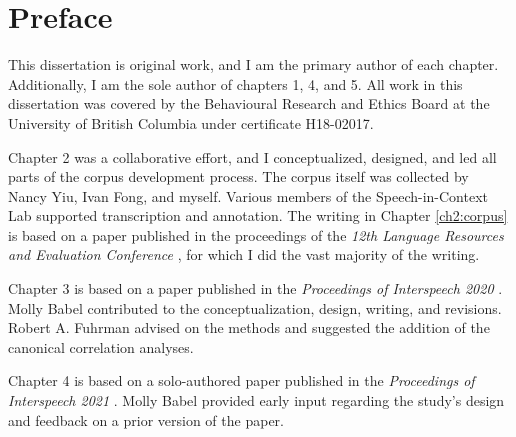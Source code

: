 
\chapter{Preface}

This dissertation is original work, and I am the primary author of each chapter. Additionally, I am the sole author of chapters 1, 4, and 5. All work in this dissertation was covered by the Behavioural Research and Ethics Board at the University of British Columbia under certificate H18-02017. 

Chapter 2 was a collaborative effort, and I conceptualized, designed, and led all parts of the corpus development process. The corpus itself was collected by Nancy Yiu, Ivan Fong, and myself. Various members of the Speech-in-Context Lab supported transcription and annotation. The writing in Chapter \ref{ch2:corpus} is based on a paper published in the proceedings of the \textit{12th Language Resources and Evaluation Conference} \citep{johnson_2020_spice}, for which I did the vast majority of the writing. 

Chapter 3 is based on a paper published in the \textit{Proceedings of Interspeech 2020} \citep{johnson_2020_bilingual}. Molly Babel contributed to the conceptualization, design, writing, and revisions. Robert A. Fuhrman advised on the methods and suggested the addition of the canonical correlation analyses. 

Chapter 4 is based on a solo-authored paper published in the \textit{Proceedings of Interspeech 2021} \citep{johnson_2021_leveraging}. Molly Babel provided early input regarding the study's design and feedback on a prior version of the paper. 

\endinput %
